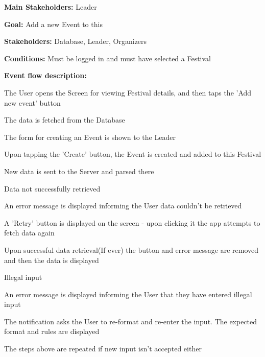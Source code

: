 			\noindent {}
			\begin{packed_item}
				\item \textbf{Main Stakeholders:} Leader
				\item \textbf{Goal:} Add a new Event to this
				\item \textbf{Stakeholders: } Database, Leader, Organizers
				\item \textbf{Conditions: } Must be logged in and must have selected a Festival
				\item \textbf{Event flow description: }
				\begin{packed_enum}
					\item The User opens the Screen for viewing Festival details, and then taps the 'Add new event' button
					\item The data is fetched from the Database
					\item The form for creating an Event is shown to the Leader
					\item Upon tapping the 'Create' button, the Event is created and added to this Festival
					\item New data is sent to the Server and parsed there
				\end{packed_enum}
				
				\begin{packed_item}
					
					\item[1.a] Data not successfully retrieved
					\item[] \begin{packed_enum}
						\item An error message is displayed informing the User data couldn't be retrieved
						\item A 'Retry' button is displayed on the screen - upon clicking it the app attempts to fetch data again
						\item Upon successful data retrieval(If ever) the button and error message are removed and then the data is displayed
					\end{packed_enum}
					
					\item[2.a] Illegal input
					\item[] \begin{packed_enum}
						\item An error message is displayed informing the User that they have entered illegal input
						\item The notification asks the User to re-format and re-enter the input. The expected format and rules are displayed
						\item The steps above are repeated if new input isn't accepted either
					\end{packed_enum}
					

\end{packed_item}
\end{packed_item}
